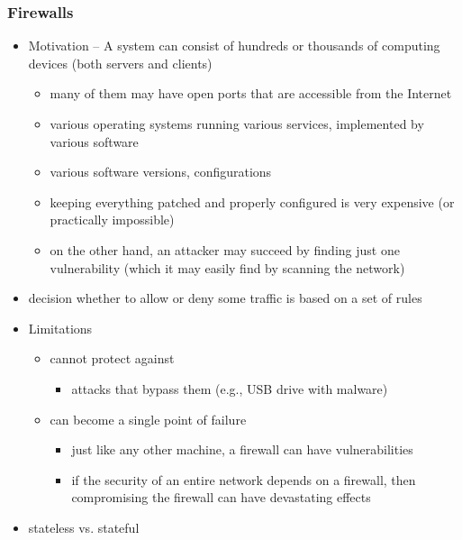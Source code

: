 \documentclass[final]{article}
\begin{document}
\subsubsection*{Firewalls}
\begin{itemize}[nosep]
    \item Motivation -- A system can consist of hundreds or thousands of computing devices (both servers and clients)
          \begin{itemize}[nosep]
              \item many of them may have open ports that are accessible from the Internet
              \item various operating systems running various services, implemented by various software
              \item various software versions, configurations
              \item keeping everything patched and properly configured is very expensive (or practically impossible)
              \item on the other hand, an attacker may succeed by finding just one vulnerability (which it may easily find by scanning the network)
          \end{itemize}
    \item decision whether to allow or deny some traffic is based on a set of rules
    \item Limitations
          \begin{itemize}
              \item cannot protect against
                    \begin{itemize}[nosep]
                        \item attacks that bypass them (e.g., USB drive with malware)
                    \end{itemize}
              \item can become a single point of failure
                    \begin{itemize}[nosep]
                        \item just like any other machine, a firewall can have vulnerabilities
                        \item if the security of an entire network depends on a firewall, then compromising the firewall can have devastating effects
                    \end{itemize}
          \end{itemize}
    \item stateless vs. stateful

\end{itemize}
\end{document}
